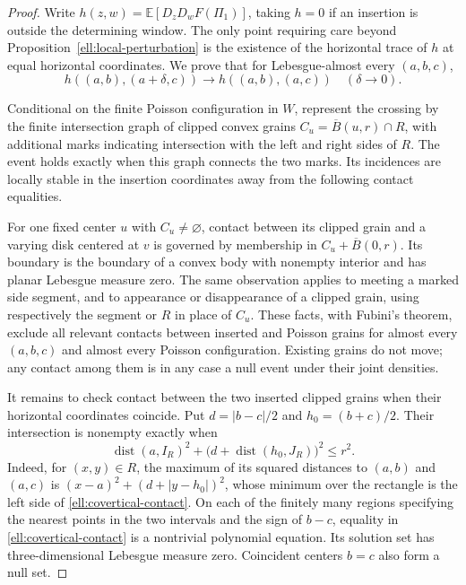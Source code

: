 \documentclass[11pt,a4paper]{article}
\theoremstyle{definition}
\theoremstyle{remark}
\numberwithin{equation}{section}
\begin{document}
\begin{proof}
Write
$h(z,w)=\mathbb E[D_zD_wF(\Pi_1)]$, taking $h=0$ if an
insertion is outside the determining window.  The only point
requiring care beyond Proposition~\ref{ell:local-perturbation}
is the existence of the horizontal trace of $h$ at equal
horizontal coordinates.  We prove that for Lebesgue-almost every
$(a,b,c)$,
\begin{equation}\label{ell:trace}
 h((a,b),(a+\delta,c))\longrightarrow
 h((a,b),(a,c))\quad(\delta\to0).
\end{equation}

Conditional on the finite Poisson configuration in $W$, represent
the crossing by the finite intersection graph of clipped convex
grains $C_u=\overline B(u,r)\cap R$, with additional marks
indicating intersection with the left and right sides of $R$.
The event holds exactly when this graph connects the two marks.
Its incidences are locally stable in the insertion coordinates
away from the following contact equalities.

For one fixed center $u$ with $C_u\ne\varnothing$, contact
between its clipped grain and a varying disk centered at $v$
is governed by membership in
$C_u+\overline B(0,r)$.  Its boundary is the boundary of a
convex body with nonempty interior and has planar Lebesgue
measure zero.  The same observation applies to meeting a marked
side segment, and to appearance or disappearance of a clipped
grain, using respectively the segment or $R$ in place of $C_u$.
These facts, with Fubini's theorem, exclude all relevant contacts
between inserted and Poisson grains for almost every
$(a,b,c)$ and almost every Poisson configuration.  Existing
grains do not move; any contact among them is in any case a
null event under their joint densities.

It remains to check contact between the two inserted clipped
grains when their horizontal coordinates coincide.  Put
$d=|b-c|/2$ and $h_0=(b+c)/2$.  Their intersection is nonempty
exactly when
\begin{equation}\label{ell:covertical-contact}
 \operatorname{dist}(a,I_R)^2+
       \bigl(d+\operatorname{dist}(h_0,J_R)\bigr)^2\le r^2.
\end{equation}
Indeed, for $(x,y)\in R$, the maximum of its squared distances
to $(a,b)$ and $(a,c)$ is
$(x-a)^2+(d+|y-h_0|)^2$, whose minimum over the rectangle
is the left side of \eqref{ell:covertical-contact}.
On each of the finitely many regions specifying the nearest
points in the two intervals and the sign of $b-c$, equality
in \eqref{ell:covertical-contact} is a nontrivial polynomial
equation.  Its solution set has three-dimensional Lebesgue
measure zero.  Coincident centers $b=c$ also form a null set.


\end{proof}
\end{document}
